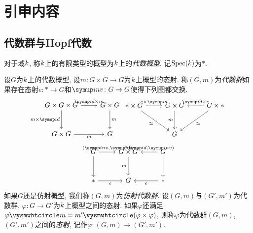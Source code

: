 \section{引申内容}

\subsection{代数群与Hopf代数}\label{sec:algebraicgrouphopfalgebra}

对于域$k$, 称$k$上的有限类型的概型为$k$上的\emph{代数概型}, 记$\operatorname{Spec} (k)$为$*$.

\begin{definition}
  设$G$为$k$上的代数概型, 设$m\colon G\times G\to G$为$k$上概型的态射. 称$(G, m)$为\emph{代数群}如果存在态射$e\colon *\to G$和$\inv\colon G\to G$使得下列图都交换.
  \begin{equation*}
    \begin{tikzcd}[row sep=large]
      G\times G\times G & G\times G\\
      G\times G & G
      \arrow[from=1-1,]{1-2}{\id\times m}
      \arrow[from=1-1,]{2-1}[swap]{m\times \id}
      \arrow[from=1-2,]{2-2}{m}
      \arrow[from=2-1,]{2-2}[swap]{m}
    \end{tikzcd}
    \quad
    \begin{tikzcd}[row sep=large]
      *\times G & G\times G & G\times *\\
      & G &
      \arrow[from=1-1,]{1-2}{e\times \id}
      \arrow[from=1-3,]{1-2}[swap]{\id\times e}
      \arrow[from=1-1,]{2-2}[swap]{\simeq}
      \arrow[from=1-3,]{2-2}{\simeq}
      \arrow[from=1-2,]{2-2}[swap]{m}
    \end{tikzcd}
  \end{equation*}
  \begin{equation*}
    \begin{tikzcd}[row sep=large]
      G & G\times G & G\\
      * & G & *
      \arrow[from=1-1,]{1-2}{(\inv, \id)}
      \arrow[from=1-2,leftarrow]{1-3}{(\id, \inv)}
      \arrow[from=2-1,]{2-2}[swap]{e}
      \arrow[from=2-2,leftarrow]{2-3}[swap]{e}
      \arrow[from=1-1,]{2-1}[swap]{}
      \arrow[from=1-2,]{2-2}[swap]{m}
      \arrow[from=1-3,]{2-3}{}
    \end{tikzcd}
  \end{equation*}
  如果$G$还是仿射概型, 我们称$(G, m)$为\emph{仿射代数群}. 设$(G, m)$与$(G', m')$为代数群, $\varphi\colon G\to G'$为$k$上概型之间的态射. 如果$\varphi$还满足$\varphi\composite m=m'\composite (\varphi\times \varphi)$, 则称$\varphi$为代数群$(G, m)$, $(G', m')$之间的\emph{态射}, 记作$\varphi\colon (G, m)\to (G', m')$.
\end{definition}

